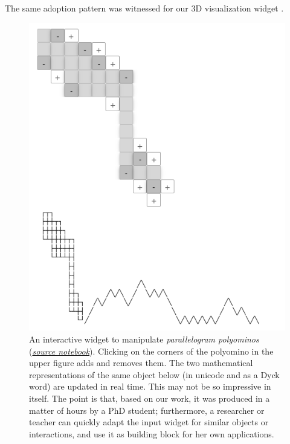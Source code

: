 \documentclass{deliverablereport}
\begin{document}
The same adoption pattern was witnessed for our 3D visualization
widget .

\begin{figure}[ht]
  \centerline{\includegraphics[width=.8\textwidth]{nheir_parallelogram_polyomino.png}}
  \caption{An interactive widget to manipulate \emph{parallelogram
      polyominos}
    (\href{https://github.com/nheir/sage-combinat-widgets/blob/example_parapolyomino/examples/ParalleloPolyomino.ipynb}{\emph{source
        notebook}}).
    Clicking on the corners of the polyomino in the upper figure adds and removes them.
    The two mathematical representations of the same object below (in
    unicode and as a Dyck word) are updated in real time.
    This may not be so impressive in itself. The point is that, based
    on our work, it was produced in a matter of hours by a PhD
    student; furthermore, a researcher or teacher can quickly adapt
    the input widget for similar objects or interactions, and use it
    as building block for her own applications.}
  \label{fig.combinat_widget}
\end{figure}



\end{document}
